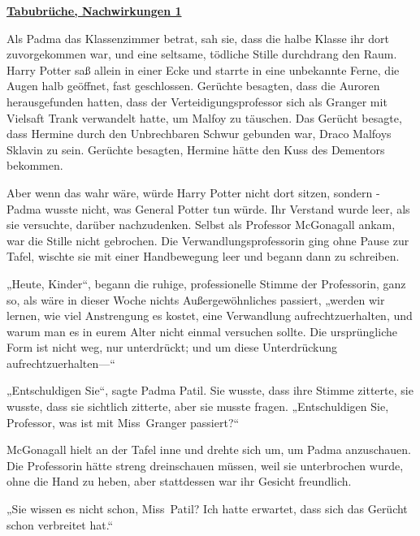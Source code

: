 

\hypertarget{tabubruxfcche-nachwirkungen-1}{%

\textbf{\uline{Tabubrüche, Nachwirkungen 1}}

Als Padma das Klassenzimmer betrat, sah sie, dass die halbe Klasse ihr dort zuvorgekommen war, und eine seltsame, tödliche Stille durchdrang den Raum. Harry Potter saß allein in einer Ecke und starrte in eine unbekannte Ferne, die Augen halb geöffnet, fast geschlossen. Gerüchte besagten, dass die Auroren herausgefunden hatten, dass der Verteidigungsprofessor sich als Granger mit Vielsaft Trank verwandelt hatte, um Malfoy zu täuschen. Das Gerücht besagte, dass Hermine durch den Unbrechbaren Schwur gebunden war, Draco Malfoys Sklavin zu sein. Gerüchte besagten, Hermine hätte den Kuss des Dementors bekommen.

Aber wenn das wahr wäre, würde Harry Potter nicht dort sitzen, sondern - Padma wusste nicht, was General Potter tun würde. Ihr Verstand wurde leer, als sie versuchte, darüber nachzudenken. Selbst als Professor McGonagall ankam, war die Stille nicht gebrochen. Die Verwandlungsprofessorin ging ohne Pause zur Tafel, wischte sie mit einer Handbewegung leer und begann dann zu schreiben.

„Heute, Kinder“, begann die ruhige, professionelle Stimme der Professorin, ganz so, als wäre in dieser Woche nichts Außergewöhnliches passiert, „werden wir lernen, wie viel Anstrengung es kostet, eine Verwandlung aufrechtzuerhalten, und warum man es in eurem Alter nicht einmal versuchen sollte. Die ursprüngliche Form ist nicht weg, nur unterdrückt; und um diese Unterdrückung aufrechtzuerhalten—“

„Entschuldigen Sie“, sagte Padma Patil. Sie wusste, dass ihre Stimme zitterte, sie wusste, dass sie sichtlich zitterte, aber sie musste fragen. „Entschuldigen Sie, Professor, was ist mit Miss~Granger passiert?“

McGonagall hielt an der Tafel inne und drehte sich um, um Padma anzuschauen. Die Professorin hätte streng dreinschauen müssen, weil sie unterbrochen wurde, ohne die Hand zu heben, aber stattdessen war ihr Gesicht freundlich.

„Sie wissen es nicht schon, Miss~Patil? Ich hatte erwartet, dass sich das Gerücht schon verbreitet hat.“

}
